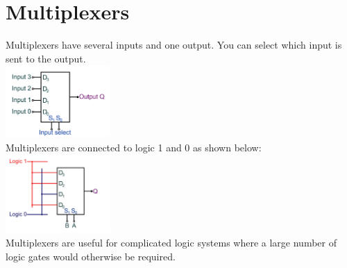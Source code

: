 \documentclass[a4paper,11pt, twocolumn]{article}
\begin{document}
\section{Multiplexers}
Multiplexers have several inputs and one output. You can select which input is sent to the output. \\
\includegraphics[width=0.3\textwidth]{4-1 mux.PNG}\\
Multiplexers are connected to logic 1 and 0 as shown below:\\
\includegraphics[width=0.3\textwidth]{mux wired.PNG}\\
Multiplexers are useful for complicated logic systems where a large number of logic gates would otherwise be required. 
\end{document}
